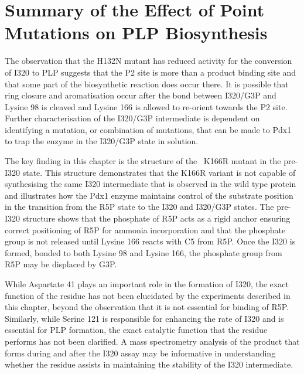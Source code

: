 \section{Summary of the Effect of Point Mutations on PLP Biosynthesis}  


The observation that the H132N mutant has reduced activity for the conversion of I320 to PLP suggests that the P2 site is more than a product binding site and that some part of the biosynthetic reaction does occur there. It is possible that ring closure and aromatisation occur after the bond between I320/G3P and Lysine 98 is cleaved and Lysine 166 is allowed to re-orient towards the P2 site. Further characterisation of the I320/G3P intermediate is dependent on identifying a mutation, or combination of mutations, that can be made to Pdx1 to trap the enzyme in the I320/G3P state in solution. 

The key finding in this chapter is the structure of the \atpdx ~K166R mutant in the pre-I320 state. This structure demonstrates that the K166R variant is not capable of synthesising the same I320 intermediate that is observed in the wild type protein and illustrates how the Pdx1 enzyme maintains control of the substrate position in the transition from the R5P state to the I320 and I320/G3P states. The pre-I320 structure shows that the phosphate of R5P acts as a rigid anchor ensuring correct positioning of R5P for ammonia incorporation and that the phosphate group is not released until Lysine 166 reacts with C5 from R5P. Once the I320 is formed, bonded to both Lysine 98 and Lysine 166, the phosphate group from R5P may be displaced by G3P.
 
While Aspartate 41 plays an important role in the formation of I320, the exact function of the residue has not been elucidated by the experiments described in this chapter, beyond the observation that it is not essential for binding of R5P. Similarly, while Serine 121 is responsible for enhancing the rate of I320 and is essential for PLP formation, the exact catalytic function that the residue performs has not been clarified. A mass spectrometry analysis of the product that forms during and after the I320 assay may be informative in understanding whether the residue assists in maintaining the stability of the I320 intermediate.   
  


